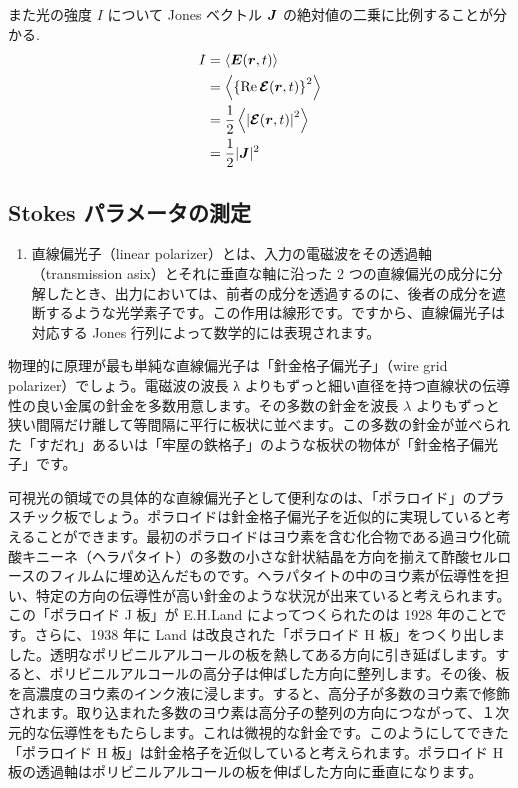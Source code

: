 \documentclass[uplatex,dvipdfmx,a4paper,11pt]{jlreq}
\newcommand{\EE}{\bm{E}}
\newcommand{\rr}{\bm{r}}
\theoremstyle{definition}
\begin{document}
また光の強度 $I$ について Jones ベクトル $\bm{J}$ の絶対値の二乗に比例することが分かる.
\begin{align}
  I & = \left\langle\EE(\rr, t)\right\rangle                   \\
    & = \left\langle\qty{\Re\EC(\rr,t)}^2\right\rangle         \\
    & = \frac{1}{2}\left\langle\qty|\EC(\rr,t)|^2\right\rangle \\
    & = \frac{1}{2}|\JJ|^2 \label{Jones strength}
\end{align}

\subsection{Stokes パラメータの測定}
\begin{definition}[光学素子]
  \begin{enumerate}
    \item 直線偏光子（linear polarizer）とは、入力の電磁波をその透過軸（transmission asix）とそれに垂直な軸に沿った 2 つの直線偏光の成分に分解したとき、出力においては、前者の成分を透過するのに、後者の成分を遮断するような光学素子です。この作用は線形です。ですから、直線偏光子は対応する Jones 行列によって数学的には表現されます。
  \end{enumerate}
  物理的に原理が最も単純な直線偏光子は「針金格子偏光子」（wire grid polarizer）でしょう。電磁波の波長 λ よりもずっと細い直径を持つ直線状の伝導性の良い金属の針金を多数用意します。その多数の針金を波長 $\lambda$ よりもずっと狭い間隔だけ離して等間隔に平行に板状に並べます。この多数の針金が並べられた「すだれ」あるいは「牢屋の鉄格子」のような板状の物体が「針金格子偏光子」です。
\end{definition}

可視光の領域での具体的な直線偏光子として便利なのは、「ポラロイド」のプラスチック板でしょう。ポラロイドは針金格子偏光子を近似的に実現していると考えることができます。最初のポラロイドはヨウ素を含む化合物である過ヨウ化硫酸キニーネ（ヘラパタイト）の多数の小さな針状結晶を方向を揃えて酢酸セルロースのフィルムに埋め込んだものです。ヘラパタイトの中のヨウ素が伝導性を担い、特定の方向の伝導性が高い針金のような状況が出来ていると考えられます。この「ポラロイド J 板」が E.H.Land によってつくられたのは 1928 年のことです。さらに、1938 年に Land は改良された「ポラロイド H 板」をつくり出しました。透明なポリビニルアルコールの板を熱してある方向に引き延ばします。すると、ポリビニルアルコールの高分子は伸ばした方向に整列します。その後、板を高濃度のヨウ素のインク液に浸します。すると、高分子が多数のヨウ素で修飾されます。取り込まれた多数のヨウ素は高分子の整列の方向につながって、１次元的な伝導性をもたらします。これは微視的な針金です。このようにしてできた「ポラロイド H 板」は針金格子を近似していると考えられます。ポラロイド H 板の透過軸はポリビニルアルコールの板を伸ばした方向に垂直になります。
\end{document}
